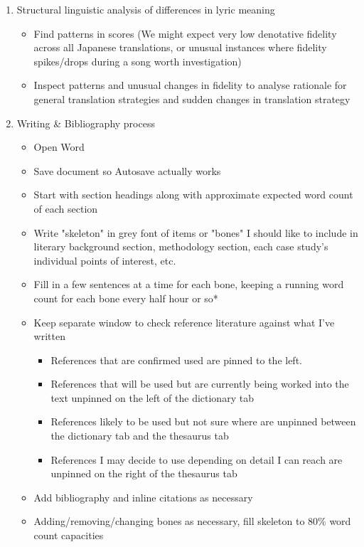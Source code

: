 \documentclass[12pt]{article}
\begin{document}
\begin{enumerate}
    \item Structural linguistic analysis of differences in lyric meaning
    \begin{itemize}
        \item Find patterns in scores (We might expect very low denotative fidelity across all Japanese translations, or unusual instances where fidelity spikes/drops during a song worth investigation)
        \item Inspect patterns and unusual changes in fidelity to analyse rationale for general translation strategies and sudden changes in translation strategy
    \end{itemize}
    \item Writing \& Bibliography process
    \begin{itemize}
        \item Open Word
        \item Save document so Autosave actually works
        \item Start with section headings along with approximate expected word count of each section
        \item Write "skeleton" in grey font of items or "bones" I should like to include in literary background section, methodology section, each case study's individual points of interest, etc.
        \item Fill in a few sentences at a time for each bone, keeping a running word count for each bone every half hour or so*
        \item Keep separate window to check reference literature against what I've written
        \begin{itemize}
            \item References that are confirmed used are pinned to the left.
            \item References that will be used but are currently being worked into the text unpinned on the left of the dictionary tab
            \item References likely to be used but not sure where are unpinned between the dictionary tab and the thesaurus tab
            \item References I may decide to use depending on detail I can reach are unpinned on the right of the thesaurus tab
        \end{itemize}
        \item Add bibliography and inline citations as necessary
        \item Adding/removing/changing bones as necessary, fill skeleton to 80\% word count capacities

\end{itemize}
\end{enumerate}
\end{document}
